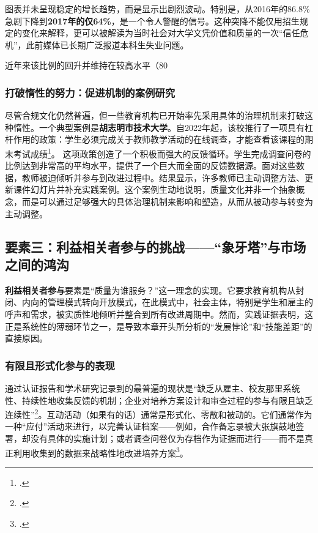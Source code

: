 图表并未呈现稳定的增长趋势，而是显示出剧烈波动。特别是，从2016年的86.8\%急剧下降到\textbf{2017年的仅64\%}，是一个令人警醒的信号。这种突降不能仅用招生规定的变化来解释，更可以被解读为当时社会对大学文凭价值和质量的一次“信任危机”，此前媒体已长期广泛报道本科生失业问题。

近年来该比例的回升并维持在较高水平（80%

\subsubsection{打破惰性的努力：促进机制的案例研究}
尽管合规文化仍然普遍，但一些教育机构已开始率先采用具体的治理机制来打破这种惰性。一个典型案例是\textbf{胡志明市技术大学}。自2022年起，该校推行了一项具有杠杆作用的政策：学生必须完成关于教师教学活动的在线调查，才能查看该课程的期末考试成绩\footcite{hutech_khao_sat_2022}。
这项政策创造了一个积极而强大的反馈循环。学生完成调查问卷的比例达到非常高的平均水平，提供了一个巨大而全面的反馈数据源。面对这些数据，教师被迫倾听并参与到改进过程中。结果显示，许多教师已主动调整方法、更新课件幻灯片并补充实践案例。这个案例生动地说明，质量文化并非一个抽象概念，而是可以通过足够强大的具体治理机制来影响和塑造，从而从被动参与转变为主动调整。





\subsection{要素三：利益相关者参与的挑战——“象牙塔”与市场之间的鸿沟}
\label{subsec:thach_thuc_lienquan}

\textbf{利益相关者参与}要素是“质量为谁服务？”这一理念的实现。它要求教育机构从封闭、内向的管理模式转向开放模式，在此模式中，社会主体，特别是学生和雇主的呼声和需求，被实质性地倾听并整合到所有改进周期中。然而，实践证据表明，这正是系统性的薄弱环节之一，是导致本章开头所分析的“发展悖论”和“技能差距”的直接原因。

\subsubsection{有限且形式化参与的表现}
通过认证报告和学术研究记录到的最普遍的现状是“缺乏从雇主、校友那里系统性、持续性地收集反馈的机制；企业对培养方案设计和审查过程的参与有限且缺乏连续性”\footcite{vnujs_er_2018}。互动活动（如果有的话）通常是形式化、零散和被动的。它们通常作为一种“应付”活动来进行，以完善认证档案——例如，合作备忘录被大张旗鼓地签署，却没有具体的实施计划；或者调查问卷仅为存档作为证据而进行——而不是真正利用收集到的数据来战略性地改进培养方案\footcite{vje_aun_implementation_2019}。

